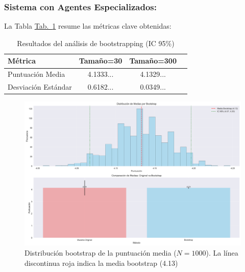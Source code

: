 \documentclass[10pt]{llncs}
\newcommand{\tabref}[1]{\hyperref[#1]{Tab.~\ref*{#1}}}
\begin{document}
\subsubsection{Sistema con Agentes Especializados:}

La Tabla \tabref{tab:boot_results_2} resume las métricas clave obtenidas:

\begin{table}[h]
\centering
\caption{Resultados del análisis de bootstrapping (IC 95\%)}
\label{tab:boot_results_2}
\begin{tabular}{lccc}
\hline
\textbf{Métrica} & \textbf{Tamaño=30} & \textbf{Tamaño=300}  \\
\hline 
Puntuación Media& 4.1333... & 4.1329...  \\
Desviación Estándar & 0.6182... & 0.0349...  \\
\hline
\end{tabular}
\end{table}

\begin{figure}[h]
\centering
\includegraphics[width=1\textwidth]{../src/experiments/specialized_agents/bootstrap_distribution_20250614-005640.png}
\caption{Distribución bootstrap de la puntuación media ($N=1000$). La línea discontinua roja indica la media bootstrap (4.13)}
\label{fig:boot_dist_2}
\end{figure}
\end{document}
